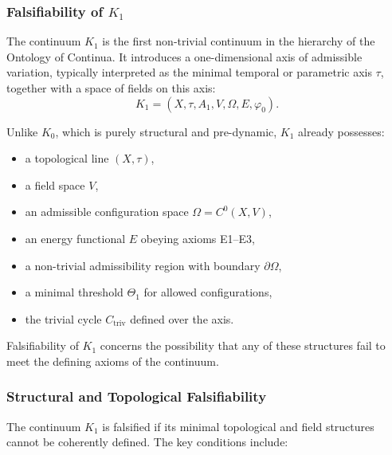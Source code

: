 
\subsubsection{Falsifiability of \texorpdfstring{$K_1$}{K_1}}
\label{sec:falsifiability-k1}

The continuum $K_1$ is the first non-trivial continuum in the hierarchy
of the Ontology of Continua.
It introduces a one-dimensional axis of admissible variation,
typically interpreted as the minimal temporal or parametric axis $\tau$,
together with a space of fields on this axis:
\[
K_1 = (X,\tau, A_1, V, \Omega, E, \varphi_0).
\]

Unlike $K_0$, which is purely structural and pre-dynamic, $K_1$ already
possesses:
\begin{itemize}
    \item a topological line $(X,\tau)$,
    \item a field space $V$,
    \item an admissible configuration space $\Omega=C^{0}(X,V)$,
    \item an energy functional $E$ obeying axioms E1–E3,
    \item a non-trivial admissibility region with boundary $\partial\Omega$,
    \item a minimal threshold $\Theta_1$ for allowed configurations,
    \item the trivial cycle $C_{\mathrm{triv}}$ defined over the axis.
\end{itemize}

Falsifiability of $K_1$ concerns the possibility that any of these
structures fail to meet the defining axioms of the continuum.



\subsubsection{Structural and Topological Falsifiability}

The continuum $K_1$ is falsified if its minimal topological and field
structures cannot be coherently defined.
The key conditions include:

